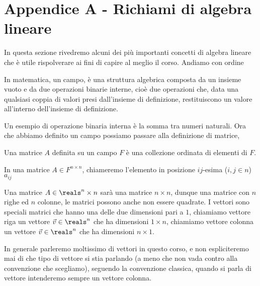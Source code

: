 \chapter{Appendice A - Richiami di algebra lineare}
\label{sec:algebra}
In questa sezione rivedremo alcuni dei più importanti concetti di algebra lineare che è utile rispolverare ai fini di capire al meglio il corso.
Andiamo con ordine

\begin{definition}
    In matematica, un campo, è una struttura algebrica composta da un insieme vuoto e da due operazioni binarie interne, cioè due operazioni che, data una qualsiasi coppia di valori presi dall'insieme di definizione, restituiscono un valore all'interno dell'insieme di definizione.
\end{definition}
Un esempio di operazione binaria interna è la somma tra numeri naturali. Ora che abbiamo definito un campo possiamo passare alla definizione di matrice,
\begin{definition}
    Una matrice $A$ definita su un campo $F$ è una collezione ordinata di elementi di $F$.

    In una matrice $A \in F^{n \times n}$, chiameremo l'elemento in posizione $ij$-esima ($i, j \in n$) $a_{ij}$
\end{definition}
Una matrice $A \in \reals^n \times n$ sarà una matrice $n \times n$, dunque una matrice con $n$ righe ed $n$ colonne, le matrici possono anche non essere quadrate. I vettori sono speciali matrici che hanno una delle due dimensioni pari a $1$, chiamiamo vettore riga un vettore $\vec{v} \in \reals^n$ che ha dimensioni $1 \times n$, chiamiamo vettore colonna un vettore $\vec{v} \in \reals^n$ che ha dimensioni $n \times 1$.

In generale parleremo moltissimo di vettori in questo corso, e non espliciteremo mai di che tipo di vettore si stia parlando (a meno che non vada contro alla convenzione che scegliamo), seguendo la convenzione classica, quando si parla di vettore intenderemo sempre un vettore colonna.


